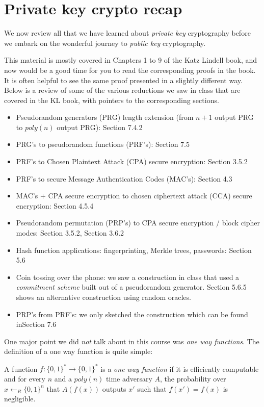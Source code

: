 \chapter{Private key crypto recap}\label{Private-key-crypto-recap}

We now review all that we have learned about \emph{private key}
cryptography before we embark on the wonderful journey to \emph{public
key} cryptography.

This material is mostly covered in Chapters 1 to 9 of the Katz Lindell
book, and now would be a good time for you to read the corresponding
proofs in the book. It is often helpful to see the same proof presented
in a slightly different way. Below is a review of some of the various
reductions we saw in class that are covered in the KL book, with
pointers to the corresponding sections.

\begin{itemize}
\tightlist
\item
  Pseudorandom generators (PRG) length extension (from \(n+1\) output
  PRG to \(poly(n)\) output PRG): Section 7.4.2
\item
  PRG's to pseudorandom functions (PRF's): Section 7.5
\item
  PRF's to Chosen Plaintext Attack (CPA) secure encryption: Section
  3.5.2
\item
  PRF's to secure Message Authentication Codes (MAC's): Section 4.3
\item
  MAC's + CPA secure encryption to chosen ciphertext attack (CCA) secure
  encryption: Section 4.5.4
\item
  Pseudorandom permutation (PRP's) to CPA secure encryption / block
  cipher modes: Section 3.5.2, Section 3.6.2
\item
  Hash function applications: fingerprinting, Merkle trees, passwords:
  Section 5.6
\item
  Coin tossing over the phone: we saw a construction in class that used
  a \emph{commitment scheme} built out of a pseudorandom generator.
  Section 5.6.5 shows an alternative construction using random oracles.
\item
  PRP's from PRF's: we only sketched the construction which can be found
  inSection 7.6
\end{itemize}

One major point we did \emph{not} talk about in this course was
\emph{one way functions}. The definition of a one way function is quite
simple:

A function \(f:\{0,1\}^*\rightarrow\{0,1\}^*\) is a \emph{one way
function} if it is efficiently computable and for every \(n\) and a
\(poly(n)\) time adversary \(A\), the probability over
\(x\leftarrow_R\{0,1\}^n\) that \(A(f(x))\) outputs \(x'\) such that
\(f(x')=f(x)\) is negligible.

